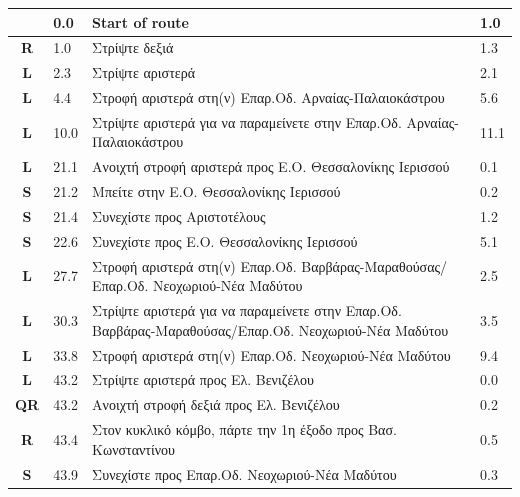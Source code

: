 \documentclass[11pt]{article}
\begin{document}
\renewcommand{\arraystretch}{1.15}
\twocolumn
{}
\tabletail{\hline}
\tablelasttail{\hline}
\begin{center}
  \begin{supertabular}{|c|p{0.30in}|p{2.25in}|l|}
  \hline
{} \textbf{} &   0.0 & Start of route &   1.0 \\ \hline
{} \textbf{R} &   1.0 & Στρίψτε δεξιά &   1.3 \\ \hline
 \textbf{L} &   2.3 & Στρίψτε αριστερά &   2.1 \\ \hline
 \textbf{L} &   4.4 & Στροφή αριστερά στη(ν) Επαρ.Οδ. Αρναίας-Παλαιοκάστρου &   5.6 \\ \hline
 \textbf{L} &  10.0 & Στρίψτε αριστερά για να παραμείνετε στην Επαρ.Οδ. Αρναίας-Παλαιοκάστρου &  11.1 \\ \hline
 \textbf{L} &  21.1 & Ανοιχτή στροφή αριστερά προς Ε.Ο. Θεσσαλονίκης Ιερισσού &   0.1 \\ \hline
 \textbf{S} &  21.2 & Μπείτε στην Ε.Ο. Θεσσαλονίκης Ιερισσού &   0.2 \\ \hline
 \textbf{S} &  21.4 & Συνεχίστε προς Αριστοτέλους &   1.2 \\ \hline
 \textbf{S} &  22.6 & Συνεχίστε προς Ε.Ο. Θεσσαλονίκης Ιερισσού &   5.1 \\ \hline
 \textbf{L} &  27.7 & Στροφή αριστερά στη(ν) Επαρ.Οδ. Βαρβάρας-Μαραθούσας/\hspace{0pt}Επαρ.Οδ. Νεοχωριού-Νέα Μαδύτου &   2.5 \\ \hline
 \textbf{L} &  30.3 & Στρίψτε αριστερά για να παραμείνετε στην Επαρ.Οδ. Βαρβάρας-Μαραθούσας/\hspace{0pt}Επαρ.Οδ. Νεοχωριού-Νέα Μαδύτου &   3.5 \\ \hline
 \textbf{L} &  33.8 & Στροφή αριστερά στη(ν) Επαρ.Οδ. Νεοχωριού-Νέα Μαδύτου &   9.4 \\ \hline
 \textbf{L} &  43.2 & Στρίψτε αριστερά προς Ελ. Βενιζέλου &   0.0 \\ \hline
{} \textbf{QR} &  43.2 & Ανοιχτή στροφή δεξιά προς Ελ. Βενιζέλου &   0.2 \\ \hline
{} \textbf{R} &  43.4 & Στον κυκλικό κόμβο, πάρτε την 1η έξοδο προς Βασ. Κωνσταντίνου &   0.5 \\ \hline
 \textbf{S} &  43.9 & Συνεχίστε προς Επαρ.Οδ. Νεοχωριού-Νέα Μαδύτου &   0.3 \\ \hline

\end{supertabular}
\end{center}
\end{document}
